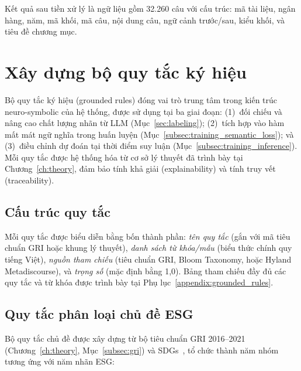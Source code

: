 Kết quả sau tiền xử lý là ngữ liệu gồm 32.260 câu với cấu trúc: mã tài liệu, ngân hàng, năm, mã khối, mã câu, nội dung câu, ngữ cảnh trước/sau, kiểu khối, và tiêu đề chương mục.


\section{Xây dựng bộ quy tắc ký hiệu}
\label{sec:symbolic_rules}

Bộ quy tắc ký hiệu (grounded rules) đóng vai trò trung tâm trong kiến trúc neuro-symbolic của hệ thống, được sử dụng tại ba giai đoạn: (1)~đối chiếu và nâng cao chất lượng nhãn từ LLM (Mục~\ref{sec:labeling}); (2)~tích hợp vào hàm mất mát ngữ nghĩa trong huấn luyện (Mục~\ref{subsec:training_semantic_loss}); và (3)~điều chỉnh dự đoán tại thời điểm suy luận (Mục~\ref{subsec:training_inference}). Mỗi quy tắc được hệ thống hóa từ cơ sở lý thuyết đã trình bày tại Chương~\ref{ch:theory}, đảm bảo tính khả giải (explainability) và tính truy vết (traceability).

\subsection{Cấu trúc quy tắc}
\label{subsec:rule_structure}

Mỗi quy tắc được biểu diễn bằng bốn thành phần: \textit{tên quy tắc} (gắn với mã tiêu chuẩn GRI hoặc khung lý thuyết), \textit{danh sách từ khóa/mẫu} (biểu thức chính quy tiếng Việt), \textit{nguồn tham chiếu} (tiêu chuẩn GRI, Bloom Taxonomy, hoặc Hyland Metadiscourse), và \textit{trọng số} (mặc định bằng 1{,}0). Bảng tham chiếu đầy đủ các quy tắc và từ khóa được trình bày tại Phụ lục~\ref{appendix:grounded_rules}.


\subsection{Quy tắc phân loại chủ đề ESG}
\label{subsec:topic_rules}

Bộ quy tắc chủ đề được xây dựng từ bộ tiêu chuẩn GRI 2016--2021 (Chương~\ref{ch:theory}, Mục~\ref{subsec:gri}) và SDGs~\cite{un_sdgs_2015}, tổ chức thành năm nhóm tương ứng với năm nhãn ESG:

